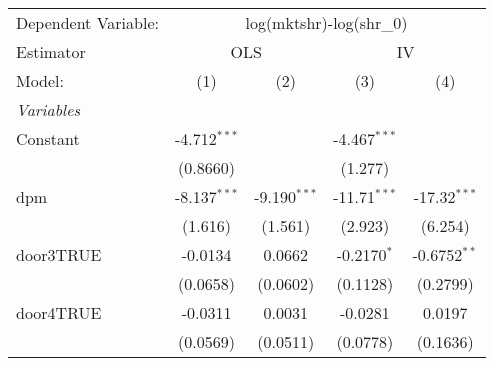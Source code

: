 
\begingroup
\centering
\begin{tabular}{lcccc}
   \tabularnewline \midrule \midrule
   Dependent Variable:                         & \multicolumn{4}{c}{log(mktshr)-log(shr\_0)}                                                                          \\
   Estimator                                   & \multicolumn{2}{c}{OLS}                     & \multicolumn{2}{c}{IV}                                                 \\
   Model:                                      & (1)                                         & (2)                    & (3)                   & (4)                   \\
   \midrule
   \emph{Variables}                                                                                                                                                   \\
   Constant                                    & -4.712$^{***}$                              &                        & -4.467$^{***}$        &                       \\
                                               & (0.8660)                                    &                        & (1.277)               &                       \\
   dpm                                         & -8.137$^{***}$                              & -9.190$^{***}$         & -11.71$^{***}$        & -17.32$^{***}$        \\
                                               & (1.616)                                     & (1.561)                & (2.923)               & (6.254)               \\
   door3TRUE                                   & -0.0134                                     & 0.0662                 & -0.2170$^{*}$         & -0.6752$^{**}$        \\
                                               & (0.0658)                                    & (0.0602)               & (0.1128)              & (0.2799)              \\
   door4TRUE                                   & -0.0311                                     & 0.0031                 & -0.0281               & 0.0197                \\
                                               & (0.0569)                                    & (0.0511)               & (0.0778)              & (0.1636)              \\

\end{tabular}
